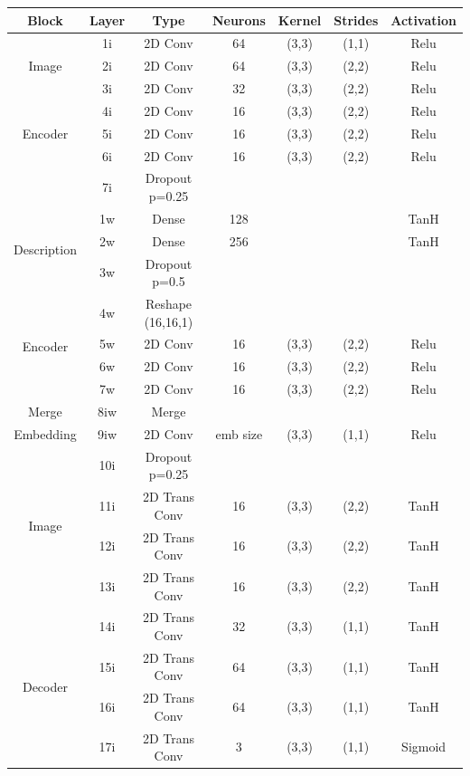\begin{table}
		\centering
		\begin{tabular}{|c|c|c|c|c|c|c|}
			\hline
			\textbf{Block} & \textbf{Layer} & \textbf{Type} & \textbf{Neurons} & \textbf{Kernel} & \textbf{Strides} & \textbf{Activation} \\ \hline
			\multirow{3}{*}{Image} & 1i	&	2D Conv & 64 & (3,3) & (1,1) & Relu \\ \cline{2-7}
			& 2i	&	2D Conv & 64 & (3,3) & (2,2) & Relu \\ \cline{2-7}
			& 3i	&	2D Conv & 32 & (3,3) & (2,2) & Relu \\ \cline{2-7}
\multirow{3}{*}{Encoder} & 4i	&	2D Conv & 16 & (3,3) & (2,2) & Relu \\ \cline{2-7}
			& 5i	&	2D Conv & 16 & (3,3) & (2,2) & Relu \\ \cline{2-7}
			& 6i	&	2D Conv & 16 & (3,3) & (2,2) & Relu \\ \cline{2-7}
			& 7i	&	Dropout p=0.25 &	 & 	     &       &  \\ \hline

			\multirow{3}{*}{Description} & 1w	& Dense & 128 & & &TanH \\ \cline{2-7}
			& 2w	& Dense & 256 & & &TanH \\ \cline{2-7}
			& 3w 	&	Dropout p=0.5 &	 & 	     &       & \\ \cline{2-7}
\multirow{4}{*}{Encoder}& 4w  &	Reshape (16,16,1) & & & & \\ \cline{2-7}
			& 5w	&	2D Conv & 16 & (3,3) & (2,2) & Relu \\ \cline{2-7}
			& 6w	&	2D Conv & 16 & (3,3) & (2,2) & Relu \\ \cline{2-7}
			& 7w	&	2D Conv & 16 & (3,3) & (2,2) & Relu \\ \hline

			Merge & 8iw	& Merge & & & & \\ \hline
Embedding & 9iw	&	2D Conv  & emb size & (3,3) & (1,1) & Relu \\ \hline
			
			
			\multirow{4}{*}{Image} & 10i 	&	Dropout p=0.25 &	 & 	     &       & \\ \cline{2-7}
			& 11i	&	2D Trans Conv & 16 & (3,3) & (2,2)  & TanH \\ \cline{2-7}
			& 12i	&	2D Trans Conv & 16 & (3,3) & (2,2)  & TanH \\ \cline{2-7}
			& 13i	&	2D Trans Conv & 16 & (3,3) & (2,2)  & TanH \\ \cline{2-7}
\multirow{4}{*}{Decoder}& 14i	&	2D Trans Conv & 32 & (3,3) & (1,1)  & TanH \\ \cline{2-7}
			& 15i	&	2D Trans Conv & 64 & (3,3) & (1,1)  & TanH \\ \cline{2-7}
			& 16i	&	2D Trans Conv & 64 & (3,3) & (1,1)  & TanH \\ \cline{2-7}
			& 17i	&	2D Trans Conv & 3 & (3,3) & (1,1) & Sigmoid\\ \hline 


\end{tabular}
\end{table}
